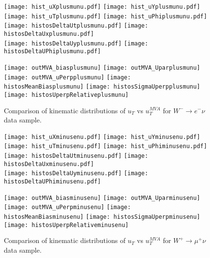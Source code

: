         \begin{figure}[h]
    	\centering
    	{\texttt{[image: hist\_uXplusmunu.pdf]}}
    	{\texttt{[image: hist\_uYplusmunu.pdf]}} \\
    	{\texttt{[image: hist\_uTplusmunu.pdf]}}
    	{\texttt{[image: hist\_uPhiplusmunu.pdf]}}\\
    	{\texttt{[image: histosDeltaUtplusmunu.pdf]}}
    	{\texttt{[image: histosDeltaUxplusmunu.pdf]}} \\
    	{\texttt{[image: histosDeltaUyplusmunu.pdf]}}
    	{\texttt{[image: histosDeltaUPhiplusmunu.pdf]}}\\
    	\label{fig:plusmunu_data_distributions1}
    \end{figure}
    \begin{figure}[h]
    	\centering
    	{\texttt{[image: outMVA\_biasplusmunu]}}
    	{\texttt{[image: outMVA\_Uparplusmunu]}}
    	{\texttt{[image: outMVA\_uPerpplusmunu]}}
    	{\texttt{[image: histosMeanBiasplusmunu]}}
    	{\texttt{[image: histosSigmaUperpplusmunu]}}
    	{\texttt{[image: histosUperpRelativeplusmunu]}}
    	\caption{Comparison of kinematic distributions of $u_T$ vs $u_T^{MVA}$ for $W^-\rightarrow e^-\nu$ data sample.}
    	\label{fig:plusmunu_data_distributions2}
    \end{figure}
    
        \begin{figure}[h]
    	\centering
    	{\texttt{[image: hist\_uXminusenu.pdf]}}
    	{\texttt{[image: hist\_uYminusenu.pdf]}} \\
    	{\texttt{[image: hist\_uTminusenu.pdf]}}
    	{\texttt{[image: hist\_uPhiminusenu.pdf]}}\\
    	{\texttt{[image: histosDeltaUtminusenu.pdf]}}
    	{\texttt{[image: histosDeltaUxminusenu.pdf]}} \\
    	{\texttt{[image: histosDeltaUyminusenu.pdf]}}
    	{\texttt{[image: histosDeltaUPhiminusenu.pdf]}}\\
    	\label{fig:minusenu_data_distributions1}
    \end{figure}
    \begin{figure}[h]
    	\centering
    	{\texttt{[image: outMVA\_biasminusenu]}}
    	{\texttt{[image: outMVA\_Uparminusenu]}}
    	{\texttt{[image: outMVA\_uPerpminusenu]}}
    	{\texttt{[image: histosMeanBiasminusenu]}}
    	{\texttt{[image: histosSigmaUperpminusenu]}}
    	{\texttt{[image: histosUperpRelativeminusenu]}}
    	\caption{Comparison of kinematic distributions of $u_T$ vs $u_T^{MVA}$ for $W^+\rightarrow \mu^+\nu$ data sample.}
    	\label{fig:minusenu_data_distributions2}
    \end{figure}
    
